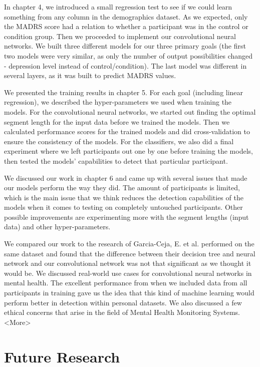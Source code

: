 In chapter 4, we introduced a small regression test to see if we could learn something from any column in the demographics dataset. As we expected, only the MADRS score had a relation to whether a participant was in the control or condition group. Then we proceeded to implement our convolutional neural networks. We built three different models for our three primary goals (the first two models were very similar, as only the number of output possibilities changed - depression level instead of control/condition). The last model was different in several layers, as it was built to predict MADRS values. 

We presented the training results in chapter 5. For each goal (including linear regression), we described the hyper-parameters we used when training the models. For the convolutional neural networks, we started out finding the optimal segment length for the input data before we trained the models. Then we calculated performance scores for the trained models and did cross-validation to ensure the consistency of the models. For the classifiers, we also did a final experiment where we left participants out one by one before training the models, then tested the models' capabilities to detect that particular participant.

We discussed our work in chapter 6 and came up with several issues that made our models perform the way they did. The amount of participants is limited, which is the main issue that we think reduces the detection capabilities of the models when it comes to testing on completely untouched participants. Other possible improvements are experimenting more with the segment lengths (input data) and other hyper-parameters. 

We compared our work to the research of Garcia-Ceja, E. et al. performed on the same dataset and found that the difference between their decision tree and neural network and our convolutional network was not that significant as we thought it would be. We discussed real-world use cases for convolutional neural networks in mental health. The excellent performance from when we included data from all participants in training gave us the idea that this kind of machine learning would perform better in detection within personal datasets. We also discussed a few ethical concerns that arise in the field of Mental Health Monitoring Systems. <More>

\section{Future Research}

